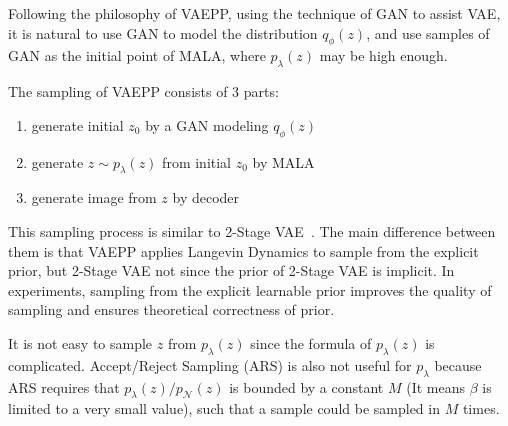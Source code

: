 Following the philosophy of VAEPP, \IE using the technique of GAN to assist VAE, it is natural to use GAN to model the distribution $q_\phi(z)$, and use samples of GAN as the initial point of MALA, where $p_\lambda(z)$ may be high enough. 

The sampling of VAEPP consists of 3 parts: 
\begin{enumerate}
	\item generate initial $z_0$ by a GAN modeling $q_\phi(z)$
	\item generate $z \sim p_\lambda(z)$ from initial $z_0$ by MALA
	\item generate image from $z$ by decoder
\end{enumerate}

This sampling process is similar to 2-Stage VAE~\cite{dai2019diagnosing}. The main difference between them is that VAEPP applies Langevin Dynamics to sample from the explicit prior, but 2-Stage VAE not since the prior of 2-Stage VAE is implicit. In experiments, sampling from the explicit learnable prior improves the quality of sampling and ensures theoretical correctness of prior. 

It is not easy to sample $z$ from $p_\lambda(z)$ since the formula of $p_\lambda(z)$ is complicated. Accept/Reject Sampling (ARS) is also not useful for $p_\lambda$ because ARS requires that $p_\lambda(z) / p_\mathcal{N}(z)$ is bounded by a constant $M$ (It means $\beta$ is limited to a very small value), such that a sample could be sampled in $M$ times.


 
 